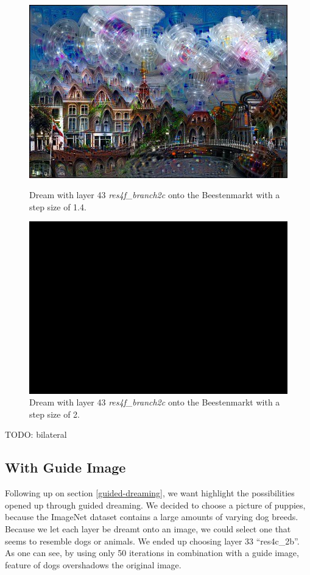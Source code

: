 \begin{figure}[H]
	\centering
	\includegraphics[width=1\linewidth]{img/houses1.jpg}
	\caption{Dream with layer 43 \emph{res4f\_branch2c} onto the Beestenmarkt with a step size of 1.4.}
	\label{fig:houses1}
	\endminipage\hfill
	\centering
	\includegraphics[width=1\linewidth]{img/houses2.jpg}
	\caption{Dream with layer 43 \emph{res4f\_branch2c} onto the Beestenmarkt with a step size of 2.}
	\label{fig:houses2}
	\endminipage\hfill
\end{figure}

TODO: bilateral


\subsection{With Guide Image}
\label{sec:withguide}
Following up on section \ref{guided-dreaming}, we want highlight the possibilities opened up through guided dreaming.
We decided to choose a picture of puppies, because the ImageNet dataset contains a large amounts of varying dog breeds.
Because we let each layer be dreamt onto an image, we could select one that seems to resemble dogs or animals.
We ended up choosing layer 33 \enquote{res4c\_2b}.
As one can see, by using only 50 iterations in combination with a guide image, feature of dogs overshadows the original image.

